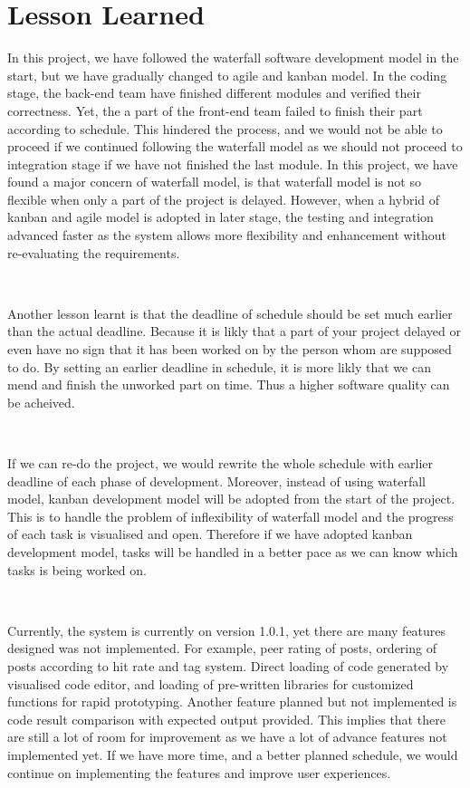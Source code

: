 \chapter{Lesson Learned}
In this project, we have followed the waterfall software development model in the start, but we have gradually changed to agile and kanban model. In the coding stage, the back-end team have finished different modules and verified their correctness. Yet, the a part of the front-end team failed to finish their part according to schedule. This hindered the process, and we would not be able to proceed if we continued following the waterfall model as we should not proceed to integration stage if we have not finished the last module. In this project, we have found a major concern of waterfall model, is that waterfall model is not so flexible when only a part of the project is delayed. However, when a hybrid of kanban and agile model is adopted in later stage, the testing and integration advanced faster as the system allows more flexibility and enhancement without re-evaluating the requirements.

~

Another lesson learnt is that the deadline of schedule should be set much earlier than the actual deadline. Because it is likly that a part of your project delayed or even have no sign that it has been worked on by the person whom are supposed to do. By setting an earlier deadline in schedule, it is more likly that we can mend and finish the unworked part on time. Thus a higher software quality can be acheived.

~

If we can re-do the project, we would rewrite the whole schedule with earlier deadline of each phase of development. Moreover, instead of using waterfall model, kanban development model will be adopted from the start of the project. This is to handle the problem of inflexibility of waterfall model and the progress of each task is visualised and open. Therefore if we have adopted kanban development model, tasks will be handled in a better pace as we can know which tasks is being worked on.

~

Currently, the system is currently on version 1.0.1, yet there are many features designed was not implemented. For example, peer rating of posts, ordering of posts according to hit rate and tag system. Direct loading of code generated by visualised code editor, and loading of pre-written libraries for customized functions for rapid prototyping. Another feature planned but not implemented is code result comparison with expected output provided. This implies that there are still a lot of room for improvement as we have a lot of advance features not implemented yet. If we have more time, and a better planned schedule, we would continue on implementing the features and improve user experiences.

